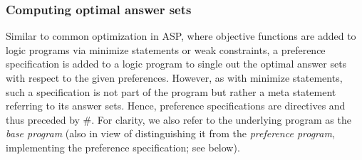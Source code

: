 \subsubsection{Computing optimal answer sets}

Similar to common optimization in ASP,
where objective functions are added to logic programs
via minimize statements or weak constraints,
a preference specification is added to a logic program
to single out the optimal answer sets with respect to the given preferences.
However, as with minimize statements,
such a specification is not part of the program
but rather a meta statement referring to its answer sets.
Hence, preference specifications are directives and thus preceded by \#.
For clarity, we also refer to the underlying program as the \emph{base program}
(also in view of distinguishing it from the \emph{preference program},
implementing the preference specification; see below).

